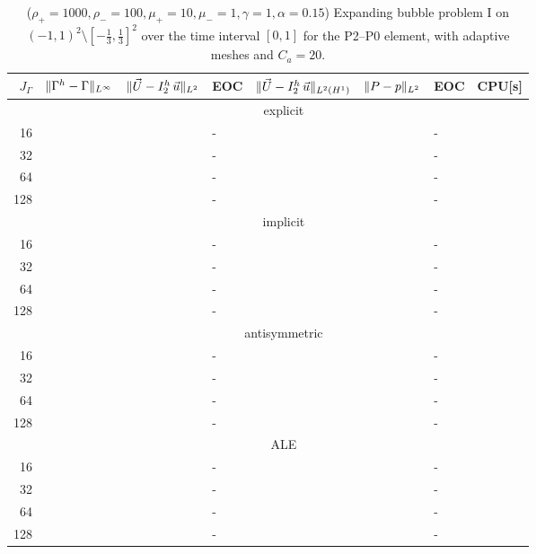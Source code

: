 \begin{table}
\center
\hspace*{-3.25cm}
\begin{tabular}{rllllllr}
\hline
$J_\Gamma$ & $\|\Gamma^h - \Gamma\|_{L^\infty}$ & $\|\vec U - I^h_{2}\,\vec u\|_{L^2}$ & EOC & $\|\vec U - I^h_{2}\,\vec u\|_{L^2(H^1)}$ & $\|P - p\|_{L^2}$ & EOC
& CPU[s] \\
\hline
& \multicolumn{7}{c}{explicit} \\
\hline
 16 & & & - & & & - & \\
 32 & & & - & & & - & \\
 64 & & & - & & & - & \\
128 & & & - & & & - & \\
\hline
& \multicolumn{7}{c}{implicit} \\
\hline
 16 & & & - & & & - & \\
 32 & & & - & & & - & \\
 64 & & & - & & & - & \\
128 & & & - & & & - & \\
\hline
& \multicolumn{7}{c}{antisymmetric} \\
\hline
 16 & & & - & & & - & \\
 32 & & & - & & & - & \\
 64 & & & - & & & - & \\
128 & & & - & & & - & \\
\hline
& \multicolumn{7}{c}{ALE} \\
\hline
 16 & & & - & & & - & \\
 32 & & & - & & & - & \\
 64 & & & - & & & - & \\
128 & & & - & & & - & \\
\hline
\end{tabular}
\hspace*{-3.25cm}
\caption[Navier--Stokes expanding bubble I errors P2--P0]
{($\rho_+ = 1000,\rho_- = 100,\mu_+ = 10,\mu_- =1,\gamma = 1,\alpha=0.15$)
Expanding bubble problem I on $(-1,1)^2\setminus[-\frac{1}{3},\frac{1}{3}]^2$
over the time interval $[0,1]$ for the P2--P0 element, with adaptive
meshes and $C_a=20$\textdegree.}
\label{tab:nsexpandingbubbleIp2p0}
\end{table}

